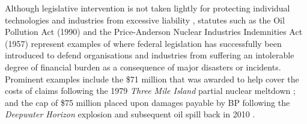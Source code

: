 \documentclass[conference]{IEEEtran}
\begin{document}
	Although legislative intervention is not taken lightly for protecting individual technologies and industries from excessive liability \cite{marchant}, statutes such as the Oil Pollution Act (1990) \cite{oil-pollution-act} and the Price-Anderson Nuclear Industries Indemnities Act (1957) \cite{nuclear-act} represent examples of where federal legislation has successfully been introduced to defend organisations and industries from suffering an intolerable degree of financial burden as a consequence of major disasters or incidents. Prominent examples include the \$71 million that was awarded to help cover the costs of claims following the 1979 \textit{Three Mile Island} partial nuclear meltdown \cite{three-mile-island}; and the cap of \$75 million placed upon damages payable by BP following the \textit{Deepwater Horizon} explosion and subsequent oil spill back in 2010 \cite{deepwater}.









		


   

%





















%
%
%
%
%
\end{document}
